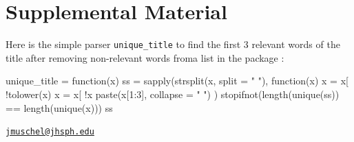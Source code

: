 \hypertarget{supplemental-material}{%
\section{Supplemental Material}\label{supplemental-material}}

Here is the simple parser \texttt{unique\_title} to find the first 3
relevant words of the title after removing non-relevant words froma list
in the  package \citep{stopwords}:

\begin{Schunk}
\begin{Sinput}
unique_title = function(x) {
  ss = sapply(strsplit(x, split = " "), 
              function(x) {
                x = x[ !tolower(x) %
                x = x[ !x %
                paste(x[1:3], collapse = " ")
              })
  stopifnot(length(unique(ss)) == length(unique(x)))
  ss
}
\end{Sinput}
\end{Schunk}



\address{%
John Muschelli\\
Department of Biostatistics, Johns Hopkins Bloomberg School of Public
Health\\
615 N Wolfe St Baltimore, MD 21205\\
}
\href{mailto:jmuschel@jhsph.edu}{\nolinkurl{jmuschel@jhsph.edu}}

